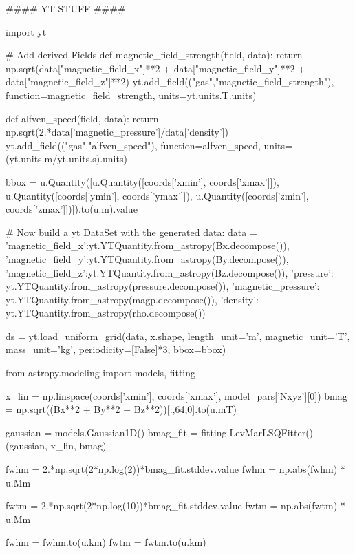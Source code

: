 \begin{pycode}[chapter3]
#### YT STUFF ####

import yt

# Add derived Fields
def magnetic_field_strength(field, data):
    return np.sqrt(data["magnetic_field_x"]**2 + data["magnetic_field_y"]**2 + data["magnetic_field_z"]**2)
yt.add_field(("gas","magnetic_field_strength"), function=magnetic_field_strength, units=yt.units.T.units)

def alfven_speed(field, data):
    return np.sqrt(2.*data['magnetic_pressure']/data['density'])
yt.add_field(("gas","alfven_speed"), function=alfven_speed, units=(yt.units.m/yt.units.s).units)

bbox = u.Quantity([u.Quantity([coords['xmin'], coords['xmax']]),
                   u.Quantity([coords['ymin'], coords['ymax']]),
                   u.Quantity([coords['zmin'], coords['zmax']])]).to(u.m).value

# Now build a yt DataSet with the generated data:
data = {'magnetic_field_x':yt.YTQuantity.from_astropy(Bx.decompose()),
        'magnetic_field_y':yt.YTQuantity.from_astropy(By.decompose()),
        'magnetic_field_z':yt.YTQuantity.from_astropy(Bz.decompose()),
        'pressure': yt.YTQuantity.from_astropy(pressure.decompose()),
        'magnetic_pressure': yt.YTQuantity.from_astropy(magp.decompose()),
        'density': yt.YTQuantity.from_astropy(rho.decompose())}

ds = yt.load_uniform_grid(data, x.shape, length_unit='m', magnetic_unit='T', mass_unit='kg', periodicity=[False]*3, bbox=bbox)
\end{pycode}

\begin{pycode}[chapter3]
from astropy.modeling import models, fitting

x_lin = np.linspace(coords['xmin'], coords['xmax'], model_pars['Nxyz'][0])
bmag = np.sqrt((Bx**2 + By**2 + Bz**2))[:,64,0].to(u.mT)

gaussian = models.Gaussian1D()
bmag_fit = fitting.LevMarLSQFitter()(gaussian, x_lin, bmag)

fwhm = 2.*np.sqrt(2*np.log(2))*bmag_fit.stddev.value
fwhm = np.abs(fwhm) * u.Mm

fwtm = 2.*np.sqrt(2*np.log(10))*bmag_fit.stddev.value
fwtm = np.abs(fwtm) * u.Mm

fwhm = fwhm.to(u.km)
fwtm = fwtm.to(u.km)
\end{pycode}

\newcommand{\BO}{{B_{0z}}}
\newcommand{\GO}{{G}}
\newcommand{\bc}{{b_{00}}}
\newcommand{\bF}{{b_{01}}}
\newcommand{\za}{{z_{1}}}
\newcommand{\bb}{{b_{02}}}
\newcommand{\zb}{{z_{2}}}

